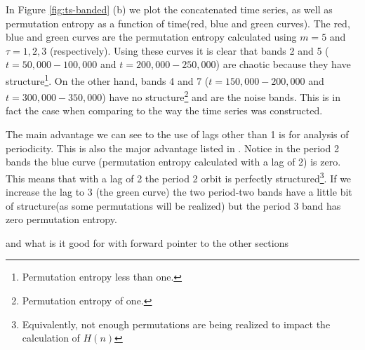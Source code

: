 In Figure \ref{fig:ts-banded} (b) we plot the concatenated time series, as well as permutation entropy as a function of time(red, blue and green curves). The red, blue and green curves are the permutation entropy calculated using $m=5$ and $\tau = 1,2,3$ (respectively). Using these curves it is clear that bands 2 and 5 ($t=50,000-100,000$ and $t=200,000-250,000$) are chaotic because they have structure\footnote{Permutation entropy less than one.}. On the other hand, bands 4 and 7 ($t=150,000-200,000$ and $t=300,000-350,000$) have no structure\footnote{Permutation entropy of one.} and are the noise bands. This is in fact the case when comparing to the way the time series was constructed.

The main advantage we can see to the use of lags other than 1 is for analysis of periodicity. This is also the major advantage listed in \cite{cao2004det}. Notice in the period 2 bands the blue curve (permutation entropy calculated with a lag of 2) is zero. This means that with a lag of 2 the period 2 orbit is perfectly structured\footnote{Equivalently, not enough permutations are being realized to impact the calculation of $H(n)$}. If we increase the lag to 3 (the green curve) the two period-two bands have a little bit of structure(as some permutations will be realized) but the period 3 band has zero permutation entropy.


%






and what is it good for with forward pointer to the other sections



